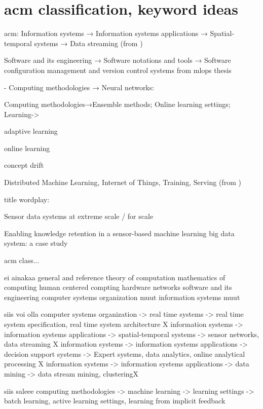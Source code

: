 \section{acm classification,  keyword ideas}

acm:
Information systems → Information systems applications →
Spatial-temporal systems → Data streaming (from \cite{uprctrajectorysystem})

Software and its engineering → Software notations and tools → Software configuration management and version control systems from mlops thesis

- Computing methodologies → Neural networks: 


 Computing methodologies→Ensemble methods; Online learning settings;
 Learning->

adaptive learning

online learning

concept drift


Distributed Machine Learning, Internet of Things, Training, Serving (from \cite{mliot})

title wordplay:

Sensor data systems at extreme scale / for scale

Enabling knowledge retention in a sensor-based machine learning big data system: a case study


acm class...

ei ainakaa
general and reference
theory of computation
mathematics of computing
human centered compting
hardware
networks
software and its engineering
computer systems organization muut
information systems muut

siis voi olla
computer systems organization -> real time systems -> real time system specification, real time system architecture X
information systems -> information systems applications -> spatial-temporal systems -> sensor networks, data streaming X
information systems -> information systems applications -> decision support systems -> Expert systems, data analytics, online analytical processing X
information systems -> information systems applications -> data mining -> data stream mining, clusteringX

siis saleee
computing methodologies -> machine learning -> learning settings -> batch learning, active learning settings, learning from implicit feedback